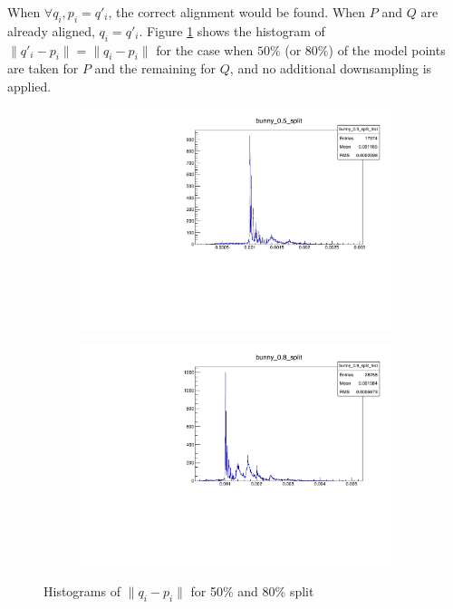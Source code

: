When $\forall q_i, p_i = q'_i$, the correct alignment would be found. When $P$ and $Q$ are already aligned, $q_i = q'_i$. Figure \ref{fig:bunny_fexp_before} shows the histogram of $\|q'_i - p_i\| = \|q_i - p_i\|$ for the case when $50\%$ (or $80\%$) of the model points are taken for $P$ and the remaining for $Q$, and no additional downsampling is applied.

\begin{figure}[H]
\centering
\begin{subfigure}{.5\textwidth}
\includegraphics[width=\linewidth]{fig/bunny_05_split.pdf}
\end{subfigure}%
\begin{subfigure}{.5\textwidth}
\includegraphics[width=\linewidth]{fig/bunny_08_split.pdf}
\end{subfigure}
\caption{Histograms of $\|q_i - p_i\|$ for 50\% and 80\% split}
\label{fig:bunny_fexp_before}
\end{figure}

